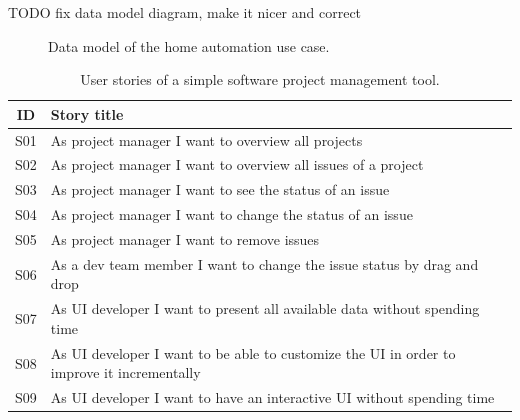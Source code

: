 TODO fix data model diagram, make it nicer and correct
\begin{figure}[!htb]
  \caption{Data model of the home automation use case.}
\end{figure}

\begin{table}
  \begin{center}
    \begin{tabular}{ |c|l| }
      \hline
      ID & Story title \\
      \hline
      S01 & As project manager I want to overview all projects \\
      S02 & As project manager I want to overview all issues of a project \\
      S03 & As project manager I want to see the status of an issue \\
      S04 & As project manager I want to change the status of an issue \\
      S05 & As project manager I want to remove issues \\
      S06 & As a dev team member I want to change the issue status by drag and drop \\
      S07 & As UI developer I want to present all available data without spending time \\
      S08 & As UI developer I want to be able to customize the UI in order to improve it incrementally \\
      S09 & As UI developer I want to have an interactive UI without spending time \\
      \hline
    \end{tabular}
    \caption{User stories of a simple software project management tool.}
  \end{center}
\end{table}


